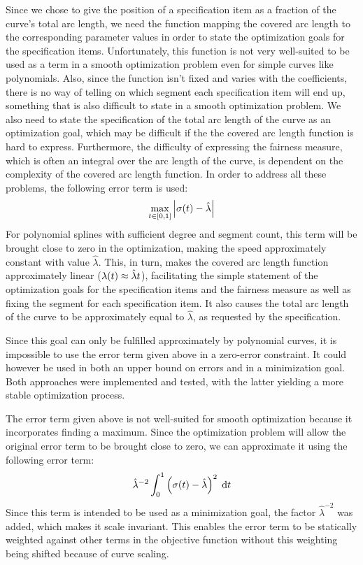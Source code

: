 \documentclass[a4paper]{article}
\begin{document}
				Since we chose to give the position of a specification item as a fraction of the curve's total arc length, we need the function mapping the covered arc length to the corresponding parameter values in order to state the optimization goals for the specification items. Unfortunately, this function is not very well-suited to be used as a term in a smooth optimization problem even for simple curves like polynomials. Also, since the function isn't fixed and varies with the coefficients, there is no way of telling on which segment each specification item will end up, something that is also difficult to state in a smooth optimization problem. We also need to state the specification of the total arc length of the curve as an optimization goal, which may be difficult if the the covered arc length function is hard to express. Furthermore, the difficulty of expressing the fairness measure, which is often an integral over the arc length of the curve, is dependent on the complexity of the covered arc length function. In order to address all these problems, the following error term is used:
				\begin{equation*}
					\max_{t \in \left[ 0,1 \right]} \left| \sigma\!\left( t \right) - \hat{\lambda} \right|
				\end{equation*}
				For polynomial splines with sufficient degree and segment count, this term will be brought close to zero in the optimization, making the speed approximately constant with value \(\hat{\lambda}\). This, in turn, makes the covered arc length function approximately linear (\(\lambda\!\left( t \right) \approx \hat{\lambda}t\)), facilitating the simple statement of the optimization goals for the specification items and the fairness measure as well as fixing the segment for each specification item. It also causes the total arc length of the curve to be approximately equal to \(\hat{\lambda}\), as requested by the specification.

				Since this goal can only be fulfilled approximately by polynomial curves, it is impossible to use the error term given above in a zero-error constraint. It could however be used in both an upper bound on errors and in a minimization goal. Both approaches were implemented and tested, with the latter yielding a more stable optimization process.

				The error term given above is not well-suited for smooth optimization because it incorporates finding a maximum. Since the optimization problem will allow the original error term to be brought close to zero, we can approximate it using the following error term:
				\begin{equation*}
					\hat{\lambda}^{-2}\int_{0}^{1} \left( \sigma\!\left( t \right) - \hat{\lambda} \right)^2 \; \mathrm{d}t
				\end{equation*}
				Since this term is intended to be used as a minimization goal, the factor \(\hat{\lambda}^{-2}\) was added, which makes it scale invariant. This enables the error term to be statically weighted against other terms in the objective function without this weighting being shifted because of curve scaling.
\end{document}
